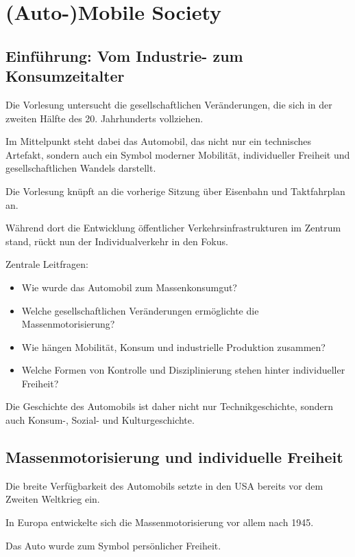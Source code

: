 \section{(Auto-)Mobile Society}

\subsection{Einführung: Vom Industrie- zum Konsumzeitalter}

Die Vorlesung untersucht die gesellschaftlichen Veränderungen,
die sich in der zweiten Hälfte des 20. Jahrhunderts vollziehen.

Im Mittelpunkt steht dabei das Automobil,
das nicht nur ein technisches Artefakt,
sondern auch ein Symbol moderner Mobilität,
individueller Freiheit und gesellschaftlichen Wandels darstellt.

Die Vorlesung knüpft an die vorherige Sitzung über Eisenbahn und Taktfahrplan an.

Während dort die Entwicklung öffentlicher Verkehrsinfrastrukturen im Zentrum stand,
rückt nun der Individualverkehr in den Fokus.

Zentrale Leitfragen:

\begin{itemize}
    \item Wie wurde das Automobil zum Massenkonsumgut?
    \item Welche gesellschaftlichen Veränderungen ermöglichte die Massenmotorisierung?
    \item Wie hängen Mobilität, Konsum und industrielle Produktion zusammen?
    \item Welche Formen von Kontrolle und Disziplinierung stehen hinter individueller Freiheit?
\end{itemize}

Die Geschichte des Automobils ist daher nicht nur Technikgeschichte,
sondern auch Konsum-, Sozial- und Kulturgeschichte.

\subsection{Massenmotorisierung und individuelle Freiheit}

Die breite Verfügbarkeit des Automobils setzte in den USA bereits
vor dem Zweiten Weltkrieg ein.

In Europa entwickelte sich die Massenmotorisierung
vor allem nach 1945.

Das Auto wurde zum Symbol persönlicher Freiheit.

